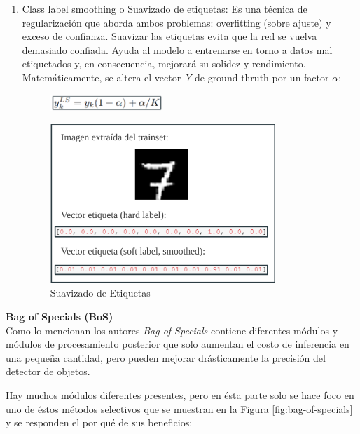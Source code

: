 \begin{enumerate}
    \item{Class label smoothing o Suavizado de etiquetas:}
    Es una técnica de regularización que aborda ambos problemas: overfitting (sobre ajuste) y exceso de confianza.
    Suavizar las etiquetas evita que la red se vuelva demasiado confiada.
    Ayuda al modelo a entrenarse en torno a datos mal etiquetados y, en consecuencia, mejorará su solidez y rendimiento.
    Matemáticamente, se altera el vector \textit{Y} de ground thruth por un factor $\alpha$:
    
    \begin{figure}[h!]
        \centering
        \includegraphics[width=0.4\textwidth]{img/suavizadoEtiqueta.png}
        \label{fig:suavizado-etiqueta}
    \end{figure}
    
    \begin{figure}[h!]
        \centering
        \includegraphics[width=0.8\textwidth]{img/suavizadoEtiquetaVector.png}
        \caption{Suavizado de Etiquetas}
        \label{fig:suavizado-etiqueta-vector}
    \end{figure}
\end{enumerate}
\hfill \break

\textbf{Bag of Specials (BoS)} \\

Como lo mencionan los autores \textit{Bag of Specials} contiene diferentes módulos y módulos de procesamiento posterior que solo aumentan el costo de inferencia en una pequeña cantidad, pero pueden mejorar drásticamente la precisión del detector de objetos. 

Hay muchos módulos diferentes presentes, pero en ésta parte solo se hace foco en uno de éstos métodos selectivos que se muestran en la Figura \ref{fig:bag-of-specials} y se responden el por qué de sus beneficios:

